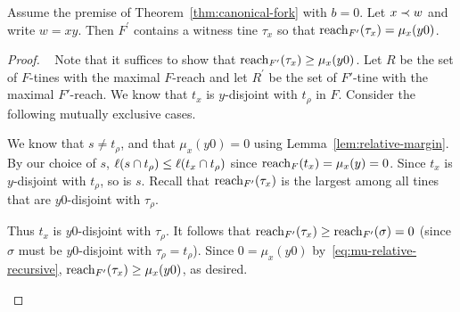 	\begin{proposition}\label{prop:optadv-tau-mu-x}
		Assume the premise of Theorem~\ref{thm:canonical-fork} with $b = 0$.
		Let $x \prec w$ and write $w = xy$.
		Then $F^\prime$ contains a witness tine $\tau_x$ 
		so that 
		$\operatorname{reach}_{F^\prime}(\tau_x) = \mu_x(y0)$. 
	\end{proposition}
	\begin{proof}~
		Note that it suffices to show that 
		$\operatorname{reach}_{F^\prime}(\tau_x) \geq \mu_x(y0)$. 
		Let $R$ be the set of $F$-tines with the maximal $F$-reach and 
		let $R^\prime$ be the set of $F'$-tine with the maximal $F'$-reach. 
		We know that $t_x$ is $y$-disjoint with $t_\rho$ in $F$. 
		Consider the following mutually exclusive cases.

		\begin{description}[font=\normalfont\itshape\space]
			\item[If $\rho(w) > 0$ and $\mu_x(y) = 0$.]
				We know that $s \neq t_\rho$, and 
				that $\mu_x(y0) = 0$ using Lemma~\ref{lem:relative-margin}. 
				By our choice of $s$, 
				$\ell(s \cap t_\rho) \leq \ell(t_x \cap t_\rho)$ 
				since $\operatorname{reach}_F(t_x) = \mu_x(y) = 0$.
				Since $t_x$ is $y$-disjoint with $t_\rho$, so is $s$. 			
				Recall that $\operatorname{reach}_{F^\prime}(\tau_x)$ is the largest among all tines 
				that are $y0$-disjoint with $\tau_\rho$. 

				\begin{description}[font=\normalfont\itshape\space]
					\item[If $\tau_\rho = t_\rho$.]
						Thus $t_x$ is $y0$-disjoint with $\tau_\rho$. 
						It follows that $\operatorname{reach}_{F^\prime}(\tau_x) \geq \operatorname{reach}_{F^\prime}(\sigma) = 0$ 
						(since $\sigma$ must be $y0$-disjoint with $\tau_\rho = t_\rho$). 
						Since $0 = \mu_x(y0)$ by~\ref{eq:mu-relative-recursive}, 
						$\operatorname{reach}_{F^\prime}(\tau_x) \geq \mu_x(y0)$, as desired.


\end{description}
\end{description}
\end{proof}
